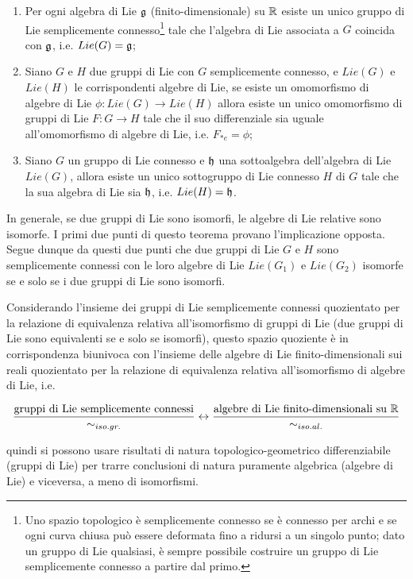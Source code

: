\begin{theorem}\hfill\break
	\begin{enumerate}
		\item Per ogni algebra di Lie $ \mathfrak{g} $ (finito-dimensionale) su $ \mathbb{R} $ esiste un unico gruppo di Lie semplicemente connesso\footnote{%
			Uno spazio topologico è semplicemente connesso se è connesso per archi e se ogni curva chiusa può essere deformata fino a ridursi a un singolo punto; dato un gruppo di Lie qualsiasi, è sempre possibile costruire un gruppo di Lie semplicemente connesso a partire dal primo.%
		} tale che l'algebra di Lie associata a $ G $ coincida con $ \mathfrak{g} $, i.e. $ Lie(G) = \mathfrak{g} $;
		
		\item Siano $ G $ e $ H $ due gruppi di Lie con $ G $ semplicemente connesso, e $ Lie(G) $ e $ Lie(H) $ le corrispondenti algebre di Lie, se esiste un omomorfismo di algebre di Lie $ \phi : Lie(G) \to Lie(H) $ allora esiste un unico omomorfismo di gruppi di Lie $ F : G \to H $ tale che il suo differenziale sia uguale all'omomorfismo di algebre di Lie, i.e. $ F_{*e} = \phi $;
		
		\item Siano $ G $ un gruppo di Lie connesso e $ \mathfrak{h} $ una sottoalgebra dell'algebra di Lie $ Lie(G) $, allora esiste un unico sottogruppo di Lie connesso $ H $ di $ G $ tale che la sua algebra di Lie sia $ \mathfrak{h} $, i.e. $ Lie(H) = \mathfrak{h} $.
	\end{enumerate}
\end{theorem}

\begin{remark}
	In generale, se due gruppi di Lie sono isomorfi, le algebre di Lie relative sono isomorfe. I primi due punti di questo teorema provano l'implicazione opposta. Segue dunque da questi due punti che due gruppi di Lie $ G $ e $ H $ sono semplicemente connessi con le loro algebre di Lie $ Lie(G_{1}) $ e $ Lie(G_{2}) $ isomorfe se e solo se i due gruppi di Lie sono isomorfi.
\end{remark}

\begin{theorem}
	Considerando l'insieme dei gruppi di Lie semplicemente connessi quozientato per la relazione di equivalenza relativa all'isomorfismo di gruppi di Lie (due gruppi di Lie sono equivalenti se e solo se isomorfi), questo spazio quoziente è in corrispondenza biunivoca con l'insieme delle algebre di Lie finito-dimensionali sui reali quozientato per la relazione di equivalenza relativa all'isomorfismo di algebre di Lie, i.e.
	
	\begin{equation}
		\dfrac{\text{gruppi di Lie semplicemente connessi}}{\sim_{iso.gr.}} %
		\leftrightarrow %
		\dfrac{\text{algebre di Lie finito-dimensionali su } \R}{\sim_{iso.al.}}
	\end{equation}
	
	quindi si possono usare risultati di natura topologico-geometrico differenziabile (gruppi di Lie) per trarre conclusioni di natura puramente algebrica (algebre di Lie) e viceversa, a meno di isomorfismi.
\end{theorem}

